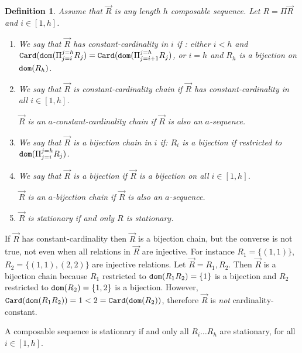 \documentclass{lmcs}
\newtheorem{definition}[theorem]{Definition}
\begin{document}
\begin{definition}
Assume that $\vec{R}$ is any length $h$ composable sequence.
Let $R = \Pi \vec{R}$ and $i \in [1,h]$.

\begin{enumerate}
\item
We say that $\vec{R}$ has constant-cardinality in $i$ if :
either $i<h$ and
${\tt Card}({\tt dom}(\Pi_{j=i}^{j=h} R_j)  = {\tt Card}({\tt dom}(\Pi_{j=i+1}^{j=h} R_j)$,
or $i=h$ and $R_h$ is a bijection on ${\tt dom}(R_h)$.

\item
We say that $\vec{R}$ is constant-cardinality chain if $\vec{R}$ has constant-cardinality
in all $i \in [1,h]$.

$\vec{R}$ is an $a$-constant-cardinality chain if $\vec{R}$ is also an $a$-sequence.

\item
We say that $\vec{R}$ is a bijection chain in $i$ if:
$R_i$ is a bijection if restricted to ${\tt dom}(\Pi_{j=i}^{j=h} R_j)$.

\item
We say that $\vec{R}$ is a bijection if $\vec{R}$ is a bijection on all $i \in [1,h]$. 

$\vec{R}$ is an $a$-bijection chain if $\vec{R}$ is also an $a$-sequence.


\item
$\vec{R}$ is stationary if and only $R$ is stationary.
\end{enumerate}

\end{definition}

If $\vec{R}$ has constant-cardinality then $\vec{R}$ is a bijection chain,
but the converse is not true, not even when all relations in $\vec{R}$ are
injective. 
For instance $R_1=\{(1,1)\}$, $R_2=\{(1,1), (2,2)\}$
are injective relations. Let $\vec{R}=R_1,R_2$. Then $\vec{R}$ is a bijection chain because
$R_1$ restricted to ${\tt dom}(R_1R_2) = \{1\}$ is a bijection and 
$R_2$ restricted to ${\tt dom}(R_2) = \{1,2\}$ is a bijection. However, 
${\tt Card}({\tt dom}(R_1R_2))  = 1 < 2 = {\tt Card}({\tt dom}(R_2))$, therefore 
$\vec{R}$ is \emph{not} cardinality-constant.

A composable sequence is stationary if and only all $R_i \ldots R_h$ are stationary, 
for all $i \in [1,h]$. 
\end{document}
